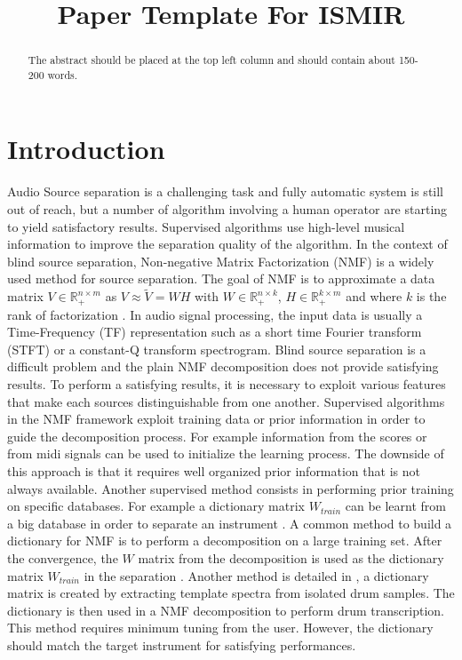 \documentclass{article}
\title{Paper Template For ISMIR \conferenceyear}
\begin{document}
%
\maketitle
%
\begin{abstract}
The abstract should be placed at the top left column and should contain about 150-200 words.
\end{abstract}
%
\section{Introduction}\label{sec:introduction}

Audio Source separation is a challenging task and fully automatic system is still out of reach, but a number of algorithm involving a human operator are starting to yield satisfactory results. Supervised algorithms use high-level musical information to improve the separation quality of the algorithm. In the context of blind source separation, Non-negative Matrix Factorization (NMF) is a widely used method for source separation. The goal of NMF is to approximate a data matrix $V \in \mathbb{R}_{+}^{n \times m} $ as $V \approx \tilde{V} = WH$ with $W \in \mathbb{R}_{+}^{n \times k}$, $H \in \mathbb{R}_{+}^{k \times m}$ and where $k$ is the rank of factorization \cite{lee99}. In audio signal processing, the input data is usually a Time-Frequency (TF) representation such as a short time Fourier transform (STFT) or a constant-Q transform spectrogram. Blind source separation is a difficult problem and the plain NMF decomposition does not provide satisfying results. To perform a satisfying results, it is necessary to exploit various features that make each sources distinguishable from one another. 
Supervised algorithms in the NMF framework exploit training data or prior information in order to guide the decomposition process. For example information from the scores or from midi signals \cite{EwertM12} can be used to initialize the learning process. The downside of this approach is that it requires well organized prior information that is not always available. Another supervised method consists in performing prior training on specific databases. For example a dictionary matrix $W_{train}$ can be learnt from a big database in order to separate an instrument \cite{jaureguiberry2011adaptation,wudrum}. A common method to build a dictionary for NMF is to perform a decomposition on a large training set. After the convergence, the $W$ matrix from the decomposition is used as the dictionary matrix $W_{train}$ in the separation \cite{jaureguiberry2011adaptation}. Another method is detailed in \cite{wudrum}, a dictionary matrix is created by extracting template spectra from isolated drum samples. The dictionary is then used in a NMF decomposition to perform drum transcription. This method requires minimum tuning from the user. However, the dictionary should match the target instrument for satisfying performances. 
\end{document}

